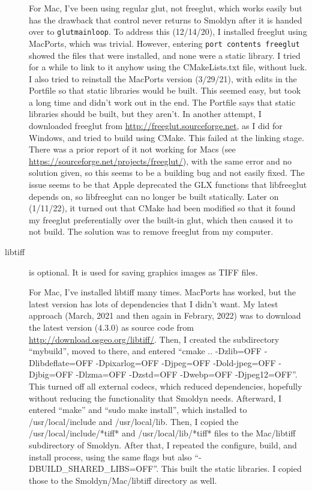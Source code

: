 \documentclass {scrbook}
\newcommand {\ttt} {\texttt}
\begin{document}
\begin{description}
For Mac, I've been using regular glut, not freeglut, which works easily but has the drawback that control never returns to Smoldyn after it is handed over to \ttt{glutmainloop}. To address this (12/14/20), I installed freeglut using MacPorts, which was trivial. However, entering \ttt{port contents freeglut} showed the files that were installed, and none were a static library. I tried for a while to link to it anyhow using the CMakeLists.txt file, without luck. I also tried to reinstall the MacPorts version (3/29/21), with edits in the Portfile so that static libraries would be built. This seemed easy, but took a long time and didn't work out in the end. The Portfile says that static libraries should be built, but they aren't. In another attempt, I downloaded freeglut from \url{http://freeglut.sourceforge.net}, as I did for Windows, and tried to build using CMake. This failed at the linking stage. There was a prior report of it not working for Macs (see \url{https://sourceforge.net/projects/freeglut/}), with the same error and no solution given, so this seems to be a building bug and not easily fixed. The issue seems to be that Apple deprecated the GLX functions that libfreeglut depends on, so libfreeglut can no longer be built statically. Later on (1/11/22), it turned out that CMake had been modified so that it found my freeglut preferentially over the built-in glut, which then caused it to not build. The solution was to remove freeglut from my computer.

\item[libtiff] is optional. It is used for saving graphics images as TIFF files.

For Mac, I've installed libtiff many times. MacPorts has worked, but the latest version has lots of dependencies that I didn't want. My latest approach (March, 2021 and then again in Febrary, 2022) was to download the latest version (4.3.0) as source code from \url{http://download.osgeo.org/libtiff/}. Then, I created the subdirectory ``mybuild'', moved to there, and entered ``cmake .. -Dzlib=OFF -Dlibdeflate=OFF -Dpixarlog=OFF -Djpeg=OFF -Dold-jpeg=OFF -Djbig=OFF -Dlzma=OFF -Dzstd=OFF -Dwebp=OFF -Djpeg12=OFF''. This turned off all external codecs, which reduced dependencies, hopefully without reducing the functionality that Smoldyn needs. Afterward, I entered ``make'' and ``sudo make install'', which installed to /usr/local/include and /usr/local/lib. Then, I copied the /usr/local/include/*tiff* and /usr/local/lib/*tiff* files to the Mac/libtiff subdirectory of Smoldyn. After that, I repeated the configure, build, and install process, using the same flags but also ``-DBUILD\_SHARED\_LIBS=OFF''. This built the static libraries. I copied those to the Smoldyn/Mac/libtiff directory as well.


\end{description}
\end{document}
